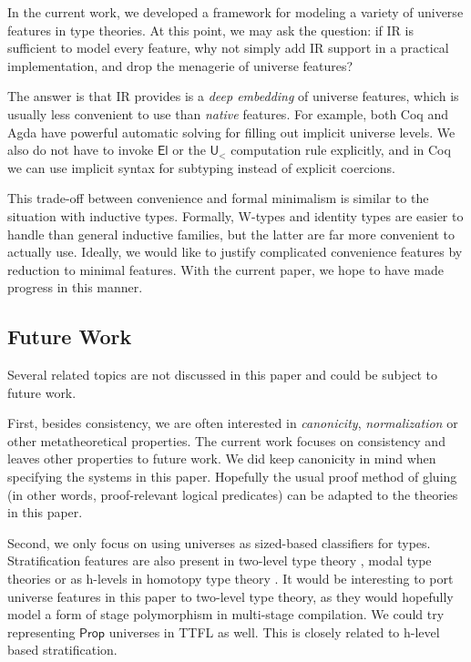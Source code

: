 \documentclass[a4paper,UKenglish,cleveref, autoref, thm-restate]{lipics-v2021}
\theoremstyle{remark}
\theoremstyle{definition}
\newcommand{\U}{\mathsf{U}}
\newcommand{\El}{\mathsf{El}}
\renewcommand{\U}{\mathsf{U}}
\newcommand{\msf}[1]{\mathsf{#1}}
\newcommand{\ult}{\U_{<}}
\begin{document}
In the current work, we developed a framework for modeling a variety of universe
features in type theories. At this point, we may ask the question: if IR is
sufficient to model every feature, why not simply add IR support in a practical
implementation, and drop the menagerie of universe features?

The answer is that IR provides is a \emph{deep embedding} of universe features,
which is usually less convenient to use than \emph{native} features. For example,
both Coq and Agda have powerful automatic solving for filling out implicit
universe levels. We also do not have to invoke $\El$ or the $\ult$ computation
rule explicitly, and in Coq we can use implicit syntax for subtyping instead of
explicit coercions.

This trade-off between convenience and formal minimalism is similar to the
situation with inductive types. Formally, W-types and identity types are easier
to handle than general inductive families, but the latter are far more
convenient to actually use. Ideally, we would like to justify complicated
convenience features by reduction to minimal features. With the current paper,
we hope to have made progress in this manner.

\subsection{Future Work}

Several related topics are not discussed in this paper and could be subject to
future work.

First, besides consistency, we are often interested in \emph{canonicity},
\emph{normalization} or other metatheoretical properties. The current work
focuses on consistency and leaves other properties to future work. We did keep
canonicity in mind when specifying the systems in this paper. Hopefully the
usual proof method of gluing (in other words, proof-relevant logical predicates)
\cite{kaposi2019gluing, sterling2019algebraic} can be adapted to the theories in
this paper.

Second, we only focus on using universes as sized-based classifiers for
types. Stratification features are also present in two-level type theory
\cite{twolevel}, modal type theories \cite{gratzer20multimodal} or as h-levels
in homotopy type theory \cite{hottbook}. It would be interesting to port
universe features in this paper to two-level type theory, as they would
hopefully model a form of stage polymorphism in multi-stage compilation. We
could try representing $\msf{Prop}$ universes in TTFL as well. This is closely
related to h-level based stratification.
\end{document}
